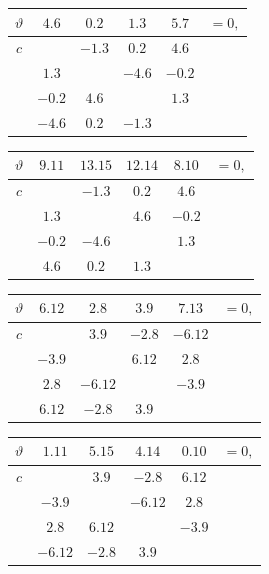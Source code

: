 \documentclass[11pt]{article}
\begin{document}
{\footnotesize
\begin{center}
\begin{tabular}{c|cccc|c}\hline
$\vartheta$ & $4.6$ & $0.2$ & $1.3$ & $5.7$ & $=0,$\\\hline
$c$ & & $-1.3$ & $0.2$ & $4.6$ & \\
& $1.3$ & & $-4.6$ & $-0.2$ & \\
& $-0.2$ & $4.6$ & & $1.3$ & \\
& $-4.6$ & $0.2$ & $-1.3$ & & \\\hline
\end{tabular}
\hspace{0.8em}
\begin{tabular}{c|cccc|c}\hline
$\vartheta$ & $9.11$ & $13.15$ & $12.14$ & $8.10$ & $=0,$\\\hline
$c$ & & $-1.3$ & $0.2$ & $4.6$ & \\
& $1.3$ & & $4.6$ & $-0.2$ & \\
& $-0.2$ & $-4.6$ & & $1.3$ & \\
& $4.6$ & $0.2$ & $1.3$ & & \\\hline
\end{tabular}
\end{center}

\smallskip
\begin{center}
\begin{tabular}{c|cccc|c}\hline
$\vartheta$ & $6.12$ & $2.8$ & $3.9$ & $7.13$ & $=0,$\\\hline
$c$ & & $3.9$ & $-2.8$ & $-6.12$ & \\
& $-3.9$ & & $6.12$ & $2.8$ & \\
& $2.8$ & $-6.12$ & & $-3.9$ & \\
& $6.12$ & $-2.8$ & $3.9$ & & \\\hline
\end{tabular}
\hspace{0.8em}
\begin{tabular}{c|cccc|c}\hline
$\vartheta$ & $1.11$ & $5.15$ & $4.14$ & $0.10$ & $=0,$\\\hline
$c$ & & $3.9$ & $-2.8$ & $6.12$ & \\
& $-3.9$ & & $-6.12$ & $2.8$ & \\
& $2.8$ & $6.12$ & & $-3.9$ & \\
& $-6.12$ & $-2.8$ & $3.9$ & & \\\hline
\end{tabular}
\end{center}

}
\end{document}
